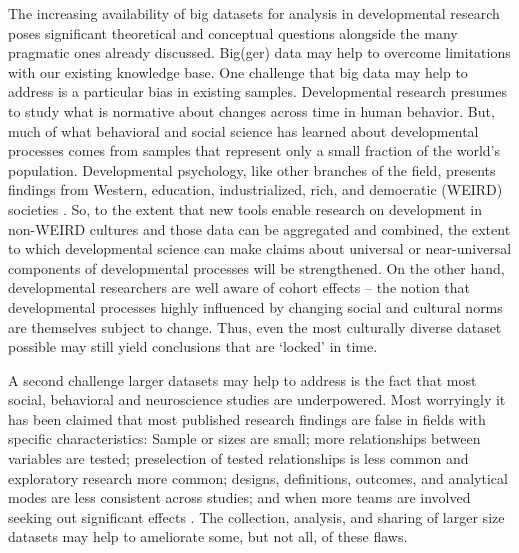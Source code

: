 \documentclass[letterpaper,man,apacite]{apa6}
\begin{document}
The increasing availability of big datasets for analysis in developmental research poses significant theoretical and conceptual questions alongside the many pragmatic ones already discussed.
Big(ger) data may help to overcome limitations with our existing knowledge base.
One challenge that big data may help to address is a particular bias in existing samples.
Developmental research presumes to study what is normative about changes across time in human behavior.
But, much of what behavioral and social science has learned about developmental processes comes from samples that represent only a small fraction of the world's population.
Developmental psychology, like other branches of the field, presents findings from Western, education, industrialized, rich, and democratic (WEIRD) societies \cite{henrich_weirdest_2010}.
So, to the extent that new tools enable research on development in non-WEIRD cultures and those data can be aggregated and combined, the extent to which developmental science can make claims about universal or near-universal components of developmental processes will be strengthened.
On the other hand, developmental researchers are well aware of cohort effects -- the notion that developmental processes highly influenced by changing social and cultural norms are themselves subject to change.
Thus, even the most culturally diverse dataset possible may still yield conclusions that are `locked' in time.

A second challenge larger datasets may help to address is the fact that most social, behavioral \cite{maxwell_persistence_2004} and neuroscience studies \cite{button_power_2013} are underpowered.
Most worryingly it has been claimed that most published research findings are false in fields with specific characteristics: Sample or sizes are small; more relationships between variables are tested; preselection of tested relationships is less common and exploratory research more common; designs, definitions, outcomes, and analytical modes are less consistent across studies; and when more teams are involved seeking out significant effects \cite{ioannidis_why_2005}.
The collection, analysis, and sharing of larger size datasets may help to ameliorate some, but not all, of these flaws.
\end{document}
